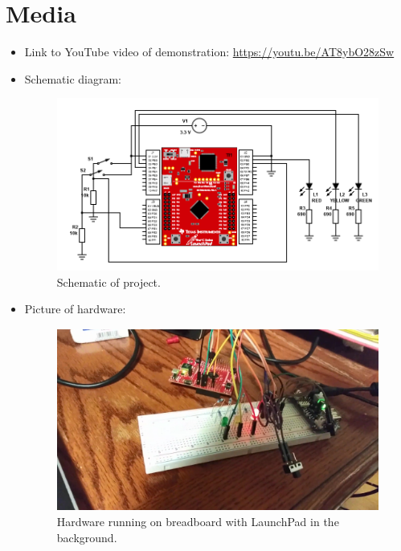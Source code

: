 \documentclass{article}
\begin{document}
\pagebreak

\section{Media} \begin{itemize}
    \item Link to YouTube video of demonstration: \url{https://youtu.be/AT8ybO28zSw}
    \item Schematic diagram: \begin{figure}[h]
        \centering
        \includegraphics[width=\textwidth]{Images/schemeit-project.png}
        \caption{Schematic of project.}
        \label{fig1}
    \end{figure}
    \item Picture of hardware: \begin{figure}[h]
        \centering
        \includegraphics[height=170pt]{Images/workspace.png}
        \caption{Hardware running on breadboard with LaunchPad in the background.}
        \label{fig2}
    \end{figure}
\end{itemize}
\end{document}
